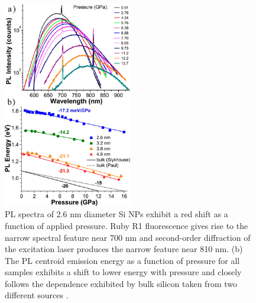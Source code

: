 \begin{figure}
\begin{center}
\includegraphics[width=0.5\textwidth]{./Chapter6/sipressure4.jpeg}
\caption[Pressure-dependent PL spectra of plasma-synthesized Si NPs.]{PL spectra of 2.6 nm diameter Si NPs exhibit a red shift as a function of applied pressure. Ruby R1 fluorescence gives rise to the narrow spectral feature near 700 nm and second-order diffraction of the excitation laser produces the narrow feature near 810 nm.  (b) The PL centroid emission energy as a function of pressure for all samples exhibits a shift to lower energy with pressure and closely follows the dependence exhibited by bulk silicon taken from two different sources \cite{PhysRev.98.1755, slykhouse1958effect}.}
\label{f:sipressure4}
\end{center}
\end{figure}

